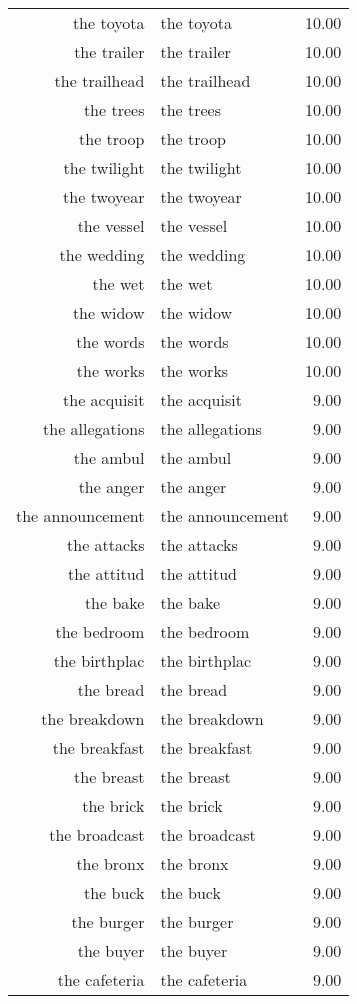 \begin{table}[ht]
\begin{tabular}{rlr}
  the toyota & the toyota & 10.00 \\ 
  the trailer & the trailer & 10.00 \\ 
  the trailhead & the trailhead & 10.00 \\ 
  the trees & the trees & 10.00 \\ 
  the troop & the troop & 10.00 \\ 
  the twilight & the twilight & 10.00 \\ 
  the twoyear & the twoyear & 10.00 \\ 
  the vessel & the vessel & 10.00 \\ 
  the wedding & the wedding & 10.00 \\ 
  the wet & the wet & 10.00 \\ 
  the widow & the widow & 10.00 \\ 
  the words & the words & 10.00 \\ 
  the works & the works & 10.00 \\ 
  the acquisit & the acquisit & 9.00 \\ 
  the allegations & the allegations & 9.00 \\ 
  the ambul & the ambul & 9.00 \\ 
  the anger & the anger & 9.00 \\ 
  the announcement & the announcement & 9.00 \\ 
  the attacks & the attacks & 9.00 \\ 
  the attitud & the attitud & 9.00 \\ 
  the bake & the bake & 9.00 \\ 
  the bedroom & the bedroom & 9.00 \\ 
  the birthplac & the birthplac & 9.00 \\ 
  the bread & the bread & 9.00 \\ 
  the breakdown & the breakdown & 9.00 \\ 
  the breakfast & the breakfast & 9.00 \\ 
  the breast & the breast & 9.00 \\ 
  the brick & the brick & 9.00 \\ 
  the broadcast & the broadcast & 9.00 \\ 
  the bronx & the bronx & 9.00 \\ 
  the buck & the buck & 9.00 \\ 
  the burger & the burger & 9.00 \\ 
  the buyer & the buyer & 9.00 \\ 
  the cafeteria & the cafeteria & 9.00 \\ 

\end{tabular}
\end{table}
